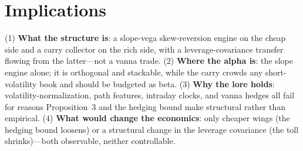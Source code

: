 \documentclass[11pt]{article}
\begin{document}
\section{Implications}
(1) \textbf{What the structure is}: a slope-vega skew-reversion engine on the cheap side and a
carry collector on the rich side, with a leverage-covariance transfer flowing from the
latter---not a vanna trade. (2) \textbf{Where the alpha is}:
the slope engine alone; it is orthogonal and stackable, while the carry crowds any
short-volatility book and should be budgeted as beta. (3) \textbf{Why the lore holds}:
volatility-normalization, path features, intraday clocks, and vanna hedges all fail for
reasons Proposition~3 and the hedging bound make structural rather than empirical.
(4) \textbf{What would change the economics}: only cheaper wings (the hedging bound loosens)
or a structural change in the leverage covariance (the toll shrinks)---both observable, neither
controllable.
\end{document}
